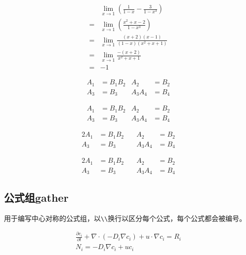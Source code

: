 \begin{align}\label{align-lim}
&\lim\limits_{x\to 1}\left(\frac{1}{1-x}-\frac{3}{1-x^3}\right)\\
= &\lim\limits_{x\to 1}\left(\frac{x^2+x-2}{1-x^3}\right)  \\
= & \lim\limits_{x\to 1}\frac{(x+2)(x-1)}{(1-x)(x^2+x+1)}\\
= & \lim\limits_{x\to 1}\frac{-(x+2)}{x^2+x+1}\\
= & -1
\end{align}

\begin{latex}
\begin{align}
A_{1} & = B_{1}B_{2} & A_{2} & =B_{2} \\
A_{3} & = B_{3} & A_{3}A_{4} & =B_{4}
\end{align}
\end{latex}

\begin{align}
A_{1} & = B_{1}B_{2} & A_{2} & =B_{2} \\
A_{3} & = B_{3} & A_{3}A_{4} & =B_{4}
\end{align}


\begin{latex}
\begin{alignat}{2}
A_{1} & = B_{1}B_{2} \quad & A_{2} & =B_{2} \\
A_{3} & = B_{3} & A_{3}A_{4} & =B_{4}
\end{alignat}
\end{latex}

\begin{alignat}{2}
A_{1} & = B_{1}B_{2} \quad & A_{2} & =B_{2} \\
A_{3} & = B_{3} & A_{3}A_{4} & =B_{4}
\end{alignat}

\subsection{公式组gather}

用于编写中心对称的公式组，以\lstinline|\\|换行以区分每个公式，每个公式都会被编号。

\begin{latex}
\begin{gather}
\frac{\partial c_i}{\partial t}+\nabla \cdot (-D_{i} \nabla c_{i})+u \cdot \nabla c_{i}=R_i \\
N_{i}=-D_{i}\nabla c_{i}+uc_{i}
\end{gather}
\end{latex}


